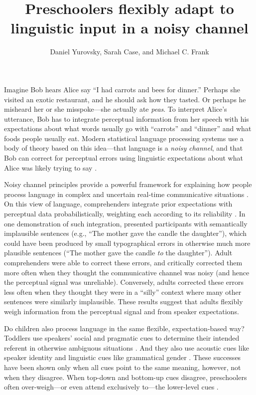 \documentclass[man,floatsintext]{apa6}
\title{Preschoolers flexibly adapt to linguistic input in a noisy channel}
\author{Daniel Yurovsky, Sarah Case, and Michael C. Frank}
\affiliation{Stanford University}
\begin{document}
\maketitle

Imagine Bob hears Alice say ``I had carrots and bees for dinner.'' Perhaps she visited an exotic restaurant, and he should ask how they tasted. Or perhaps he misheard her or she misspoke---she actually ate \emph{peas}. To interpret Alice's utterance, Bob has to integrate perceptual information from her speech with his expectations about what words usually go with ``carrots'' and ``dinner'' and what foods people usually eat. Modern statistical language processing systems use a body of theory based on this idea---that language is a \emph{noisy channel}, and that Bob can correct for perceptual errors using linguistic expectations about what Alice was likely trying to say \cite{jelinek1976, shannon1948}.

Noisy channel principles provide a powerful framework for explaining how people process language in complex and uncertain real-time communicative situations \cite{clayards2008, levy2008, jaeger2010}. On this view of language, comprehenders integrate prior expectations with perceptual data probabilistically, weighting each according to its reliability \cite{ernst2002, jacobs1999}. In one demonstration of such integration,  presented participants with semantically implausible sentences (e.g., ``The mother gave the candle the daughter''), which could have been produced by small typographical errors in otherwise much more plausible sentences (``The mother gave the candle \emph{to} the daughter''). Adult comprehenders were able to correct these errors, and critically corrected them more often when they thought the communicative channel was noisy (and hence the perceptual signal was unreliable). Conversely, adults corrected these errors less often when they thought they were in a ``silly'' context where many other sentences were similarly implausible. These results suggest that adults flexibly weigh information from the perceptual signal and from speaker expectations.

Do children also process language in the same flexible, expectation-based way? Toddlers use speakers' social and pragmatic cues to determine their intended referent in otherwise ambiguous situations \cite{carpenter1998, clark2009}. And they also use acoustic cues like speaker identity and linguistic cues like grammatical gender \cite{lew-williams2007, creel2012}. These successes have been shown only when all cues point to the same meaning, however, not when they disagree. When top-down and bottom-up cues disagree, preschoolers often over-weigh---or even attend exclusively to---the lower-level cues \cite{trueswell1999,snedeker2004}.
\end{document}
